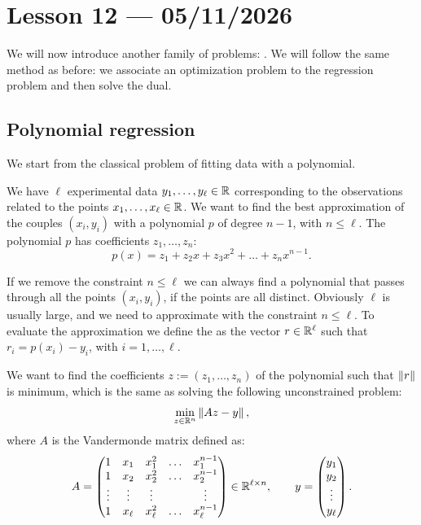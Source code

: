 \section{Lesson 12 --- 05/11/2026}

We will now introduce another family of problems: . We will follow the same method as before: we associate an optimization problem to the regression problem and then solve the dual.

\subsection{Polynomial regression}

We start from the classical problem of fitting data with a polynomial.

We have $\ell$ experimental data $y_1,\dots,y_\ell \in \mathbb{R}$ corresponding to the observations related to the points $x_1,\dots,x_\ell \in \mathbb{R}$. We want to find the best approximation of the couples $(x_i,y_i)$ with a polynomial $p$ of degree $n-1$, with $n \le \ell$. The polynomial $p$ has coefficients $z_1,\dots,z_n$:
\[
p(x) = z_1 + z_2 x + z_3 x^2 + \dots + z_n x^{n-1}.
\]

If we remove the constraint $n \le \ell$ we can always find a polynomial that passes through all the points $(x_i,y_i)$, if the points are all distinct. Obviously $\ell$ is usually large, and we need to approximate with the constraint $n \le \ell$. To evaluate the approximation we define the  as the vector $r \in \mathbb{R}^\ell$ such that $r_i = p(x_i) - y_i$, with $i=1,\dots,\ell$.

We want to find the coefficients $z := (z_1,\dots,z_n)$ of the polynomial such that $\left\lVert r \right\rVert$ is minimum, which is the same as solving the following unconstrained problem:
\[
\min_{z \in \mathbb{R}^n} \left\lVert Az - y \right\rVert,
\]
where $A$ is the Vandermonde matrix defined as:
\[
A =
\begin{pmatrix}
1 & x_1 & x_1^2 & \dots & x_1^{n-1}\\
1 & x_2 & x_2^2 & \dots & x_2^{n-1}\\
\vdots & \vdots & \vdots & & \vdots\\
1 & x_\ell & x_\ell^2 & \dots & x_\ell^{n-1}
\end{pmatrix}
\in \mathbb{R}^{\ell \times n},
\qquad
y =
\begin{pmatrix}
y_1\\ y_2\\ \vdots\\ y_\ell
\end{pmatrix}.
\]

